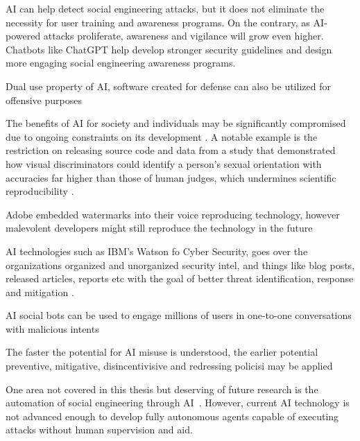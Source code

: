 AI can help detect social engineering attacks, but it does not eliminate the necessity for user training and awareness programs. On the contrary, as AI-powered attacks proliferate, awareness and vigilance will grow even higher. Chatbots like ChatGPT help develop stronger security guidelines and design more engaging social engineering awareness programs.

Dual use property of AI, software created for defense can also be utilized for offensive purposes \citep{blauth_AI_Crime_Overview_Malicious_Use_Abuse_2022}

The benefits of AI for society and individuals may be significantly compromised due to ongoing constraints on its development \citep{king_AI_Crime_Interdisciplinary_Analysis_2019}. A notable example is the restriction on releasing source code and data from a study that demonstrated how visual discriminators could identify a person's sexual orientation with accuracies far higher than those of human judges, which undermines scientific reproducibility \citep{king_AI_Crime_Interdisciplinary_Analysis_2019}.

Adobe embedded watermarks into their voice reproducing technology, however malevolent developers might still reproduce the technology in the future \citep{king_AI_Crime_Interdisciplinary_Analysis_2019}

AI technologies such as IBM's Watson fo Cyber Security, goes over the organizations organized and unorganized security intel, and things like blog posts, released articles, reports etc with the goal of better threat identification, response and mitigation \citep{king_AI_Crime_Interdisciplinary_Analysis_2019}.

AI social bots can be used to engage millions of users in one-to-one conversations with malicious intents \citep{king_AI_Crime_Interdisciplinary_Analysis_2019}

The faster the potential for AI misuse is understood, the earlier potential preventive, mitigative, disincentivisive and redressing policisi may be applied \citep{king_AI_Crime_Interdisciplinary_Analysis_2019}

One area not covered in this thesis but deserving of future research is the automation of social engineering through AI~\citep{mirsky_Threat_Offensive_AI_Organizations_2023}. However, current AI technology is not advanced enough to develop fully autonomous agents capable of executing attacks without human supervision and aid.



